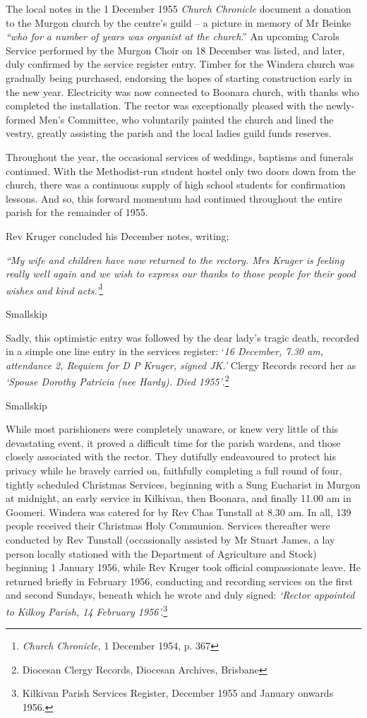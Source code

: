 The local notes in the 1 December 1955 \emph{Church Chronicle} document a donation to the Murgon church by the centre's guild -- a picture in memory of Mr Beinke \emph{``who for a number of years was organist at the church}.'' An upcoming Carols Service performed by the Murgon Choir on 18 December was listed, and later, duly confirmed by the service register entry. Timber for the Windera church was gradually being purchased, endorsing the hopes of starting construction early in the new year. Electricity was now connected to Boonara church, with thanks who completed the installation. The rector was exceptionally pleased with the newly-formed Men's Committee, who voluntarily painted the church and lined the vestry, greatly assisting the parish and the local ladies guild funds reserves.

Throughout the year, the occasional services of weddings, baptisms and funerals continued. With the Methodist-run student hostel only two doors down from the church, there was a continuous supply of high school students for confirmation lessons. And so, this forward momentum had continued throughout the entire parish for the remainder of 1955.

Rev Kruger concluded his December notes, writing;

\emph{``My wife and children have now returned to the rectory. Mrs Kruger is feeling really well again and we wish to express our thanks to those people for their good wishes and kind acts.'}\footnote{\emph{Church Chronicle,} 1 December 1954, p. 367}

Smallskip

Sadly, this optimistic entry was followed by the dear lady's tragic death, recorded in a simple one line entry in the services register: `\emph{16 December, 7.30 am, attendance 2, Requiem for D P Kruger, signed JK.'} Clergy Records record her as \emph{`Spouse Dorothy Patricia (nee Hardy). Died 1955'}.\footnote{Diocesan Clergy Records, Diocesan Archives, Brisbane}

Smallskip

While most parishioners were completely unaware, or knew very little of this devastating event, it proved a difficult time for the parish wardens, and those closely associated with the rector. They dutifully endeavoured to protect his privacy while he bravely carried on, faithfully completing a full round of four, tightly scheduled Christmas Services, beginning with a Sung Eucharist in Murgon at midnight, an early service in Kilkivan, then Boonara, and finally 11.00 am in Goomeri. Windera was catered for by Rev Chas Tunstall at 8.30 am. In all, 139 people received their Christmas Holy Communion. Services thereafter were conducted by Rev Tunstall (occasionally assisted by Mr Stuart James, a lay person locally stationed with the Department of Agriculture and Stock) beginning 1 January 1956, while Rev Kruger took official compassionate leave. He returned briefly in February 1956, conducting and recording services on the first and second Sundays, beneath which he wrote and duly signed: \emph{`Rector appointed to Kilkoy Parish, 14 February 1956'.}\footnote{Kilkivan Parish Services Register, December 1955 and January onwards 1956.}

